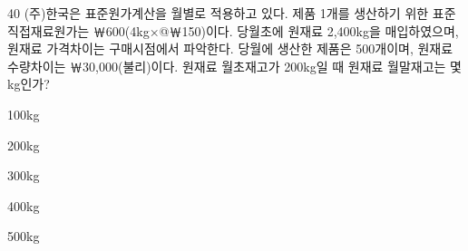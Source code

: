 \begin{question}{40}
(주)한국은 표준원가계산을 월별로 적용하고 있다. 제품 1개를 생산하기 위한 표준직접재료원가는 ￦600(4kg×\allowbreak{}@￦150)이다. 당월초에 원재료 2,400kg을 매입하였으며, 원재료 가격차이는 구매시점에서 파악한다. 당월에 생산한 제품은 500개이며, 원재료 수량차이는 ￦30,000(불리)이다. 원재료 월초재고가 200kg일 때 원재료 월말재고는 몇 kg인가?
\begin{choices}
  \item 100kg
  \item 200kg
  \item 300kg
  \item 400kg
  \item 500kg
\end{choices}
\end{question}
